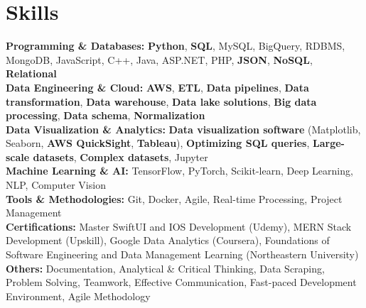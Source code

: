\documentclass[a4paper,10pt]{article}
\begin{document}
\section*{Skills}
\textbf{Programming \& Databases: } \textbf{Python}, \textbf{SQL}, MySQL, BigQuery, RDBMS, MongoDB, JavaScript, C++, Java, ASP.NET, PHP, \textbf{JSON}, \textbf{NoSQL}, \textbf{Relational} \\
\textbf{Data Engineering \& Cloud: } \textbf{AWS}, \textbf{ETL}, \textbf{Data pipelines}, \textbf{Data transformation}, \textbf{Data warehouse}, \textbf{Data lake solutions}, \textbf{Big data processing}, \textbf{Data schema}, \textbf{Normalization} \\
\textbf{Data Visualization \& Analytics: } \textbf{Data visualization software} (Matplotlib, Seaborn, \textbf{AWS QuickSight}, \textbf{Tableau}), \textbf{Optimizing SQL queries}, \textbf{Large-scale datasets}, \textbf{Complex datasets}, Jupyter \\
\textbf{Machine Learning \& AI: } TensorFlow, PyTorch, Scikit-learn, Deep Learning, NLP, Computer Vision \\
\textbf{Tools \& Methodologies: } Git, Docker, Agile, Real-time Processing, Project Management \\
\textbf{Certifications:} Master SwiftUI and IOS Development (Udemy), MERN Stack Development (Upskill), Google Data Analytics (Coursera), Foundations of Software Engineering and Data Management Learning (Northeastern University) \\
\textbf{Others: }Documentation, Analytical \& Critical Thinking, Data Scraping, Problem Solving, Teamwork, Effective Communication, Fast-paced Development Environment, Agile Methodology \\

\vspace{-4mm}
\end{document}
